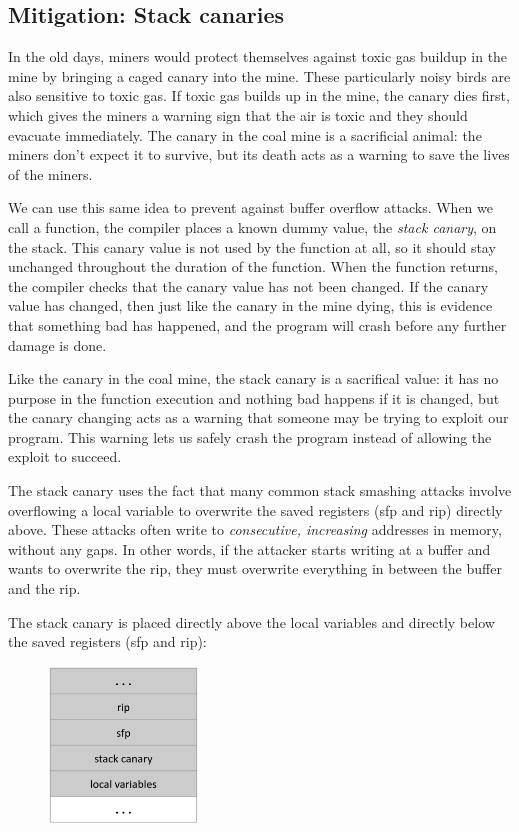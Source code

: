 \documentclass[a4paper]{exam}
\theoremstyle{definition}
\begin{document}
\subsection{Mitigation: Stack
canaries}

In the old days, miners would protect themselves against toxic gas
buildup in the mine by bringing a caged canary into the mine. These
particularly noisy birds are also sensitive to toxic gas. If toxic gas
builds up in the mine, the canary dies first, which gives the miners a
warning sign that the air is toxic and they should evacuate immediately.
The canary in the coal mine is a sacrificial animal: the miners don't
expect it to survive, but its death acts as a warning to save the lives
of the miners.

We can use this same idea to prevent against buffer overflow attacks.
When we call a function, the compiler places a known dummy value, the
\emph{stack canary}, on the stack. This canary value is not used by the
function at all, so it should stay unchanged throughout the duration of
the function. When the function returns, the compiler checks that the
canary value has not been changed. If the canary value has changed, then
just like the canary in the mine dying, this is evidence that something
bad has happened, and the program will crash before any further damage
is done.

Like the canary in the coal mine, the stack canary is a sacrifical
value: it has no purpose in the function execution and nothing bad
happens if it is changed, but the canary changing acts as a warning that
someone may be trying to exploit our program. This warning lets us
safely crash the program instead of allowing the exploit to succeed.

The stack canary uses the fact that many common stack smashing attacks
involve overflowing a local variable to overwrite the saved registers
(sfp and rip) directly above. These attacks often write to
\emph{consecutive, increasing} addresses in memory, without any gaps. In
other words, if the attacker starts writing at a buffer and wants to
overwrite the rip, they must overwrite everything in between the buffer
and the rip.

The stack canary is placed directly above the local variables and
directly below the saved registers (sfp and rip):

\begin{figure}
\centering
\includegraphics[width=4cm]{./img/canary.png}
\caption{}
\end{figure}
\end{document}
